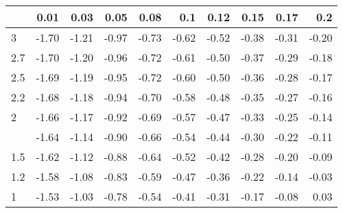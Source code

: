 
\begin{tabular}{lrrrrrrrrr}
\toprule
  & 0.01 & 0.03 & 0.05 & 0.08 & 0.1 & 0.12 & 0.15 & 0.17 & 0.2\\
\midrule
3 & -1.70 & -1.21 & -0.97 & -0.73 & -0.62 & -0.52 & -0.38 & -0.31 & -0.20\\
2.7 & -1.70 & -1.20 & -0.96 & -0.72 & -0.61 & -0.50 & -0.37 & -0.29 & -0.18\\
2.5 & -1.69 & -1.19 & -0.95 & -0.72 & -0.60 & -0.50 & -0.36 & -0.28 & -0.17\\
2.2 & -1.68 & -1.18 & -0.94 & -0.70 & -0.58 & -0.48 & -0.35 & -0.27 & -0.16\\
2 & -1.66 & -1.17 & -0.92 & -0.69 & -0.57 & -0.47 & -0.33 & -0.25 & -0.14\\
\addlinespace
1.7 & -1.64 & -1.14 & -0.90 & -0.66 & -0.54 & -0.44 & -0.30 & -0.22 & -0.11\\
1.5 & -1.62 & -1.12 & -0.88 & -0.64 & -0.52 & -0.42 & -0.28 & -0.20 & -0.09\\
1.2 & -1.58 & -1.08 & -0.83 & -0.59 & -0.47 & -0.36 & -0.22 & -0.14 & -0.03\\
1 & -1.53 & -1.03 & -0.78 & -0.54 & -0.41 & -0.31 & -0.17 & -0.08 & 0.03\\
\bottomrule
\end{tabular}

